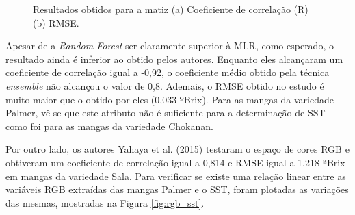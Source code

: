 \begin{figure}[H]
\centering
	\caption{Resultados obtidos para a matiz (a) Coeficiente de correlação (R) (b) RMSE.}
	\label{fig:fold_sst_hue}
\end{figure}

Apesar de a \textit{Random Forest} ser claramente superior à MLR, como esperado, o resultado ainda é inferior ao obtido pelos autores. Enquanto eles alcançaram um coeficiente de correlação igual a -0,92, o coeficiente médio obtido pela técnica \textit{ensemble} não alcançou o valor de 0,8. Ademais, o RMSE obtido no estudo é muito maior que o obtido por eles (0,033 ºBrix). Para as mangas da variedade Palmer, vê-se que este atributo não é suficiente para a determinação de SST como foi para as mangas da variedade Chokanan.

Por outro lado, os autores Yahaya et al. (2015) testaram o espaço de cores RGB e obtiveram um coeficiente de correlação igual a 0,814 e RMSE igual a 1,218 ªBrix em mangas da variedade Sala. Para verificar se existe uma relação linear entre as variáveis RGB extraídas das mangas Palmer e o SST, foram plotadas as variações das mesmas, mostradas na Figura \ref{fig:rgb_sst}.

